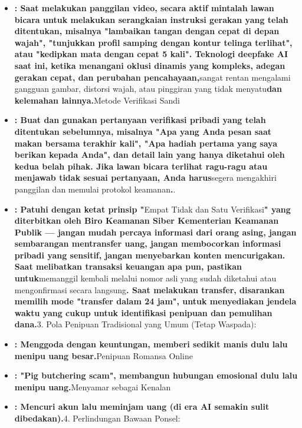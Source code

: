 \begin{itemize}
  \item \textbf{: Saat melakukan panggilan video, secara aktif mintalah lawan bicara untuk melakukan serangkaian instruksi gerakan yang telah ditentukan, misalnya "lambaikan tangan dengan cepat di depan wajah", "tunjukkan profil samping dengan kontur telinga terlihat", atau "kedipkan mata dengan cepat 5 kali". Teknologi deepfake AI saat ini, ketika menangani oklusi dinamis yang kompleks, adegan gerakan cepat, dan perubahan pencahayaan,}sangat rentan mengalami gangguan gambar, distorsi wajah, atau pinggiran yang tidak menyatu\textbf{dan kelemahan lainnya.}Metode Verifikasi Sandi
  \item \textbf{: Buat dan gunakan pertanyaan verifikasi pribadi yang telah ditentukan sebelumnya, misalnya "Apa yang Anda pesan saat makan bersama terakhir kali", "Apa hadiah pertama yang saya berikan kepada Anda", dan detail lain yang hanya diketahui oleh kedua belah pihak. Jika lawan bicara terlihat ragu-ragu atau menjawab tidak sesuai pertanyaan, Anda harus}segera mengakhiri panggilan dan memulai protokol keamanan\textbf{.}.
  \item \textbf{: Patuhi dengan ketat prinsip "}Empat Tidak dan Satu Verifikasi\textbf{" yang diterbitkan oleh Biro Keamanan Siber Kementerian Keamanan Publik — jangan mudah percaya informasi dari orang asing, jangan sembarangan mentransfer uang, jangan membocorkan informasi pribadi yang sensitif, jangan menyebarkan konten mencurigakan. Saat melibatkan transaksi keuangan apa pun, pastikan untuk}memanggil kembali melalui nomor asli yang sudah diketahui atau mengonfirmasi secara langsung\textbf{. Saat melakukan transfer, disarankan memilih mode "transfer dalam 24 jam", untuk menyediakan jendela waktu yang cukup untuk identifikasi penipuan dan pemulihan dana.}3. Pola Penipuan Tradisional yang Umum (Tetap Waspada):
\end{itemize}


\begin{itemize}
  \item \textbf{: Menggoda dengan keuntungan, memberi sedikit manis dulu lalu menipu uang besar.}Penipuan Romansa Online
  \item \textbf{: "Pig butchering scam", membangun hubungan emosional dulu lalu menipu uang.}Menyamar sebagai Kenalan
  \item \textbf{: Mencuri akun lalu meminjam uang (di era AI semakin sulit dibedakan).}4. Perlindungan Bawaan Ponsel:
\end{itemize}

